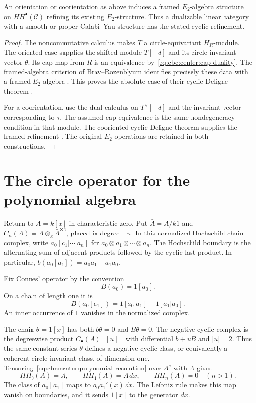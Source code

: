 \begin{theorem}\label{cbc:center:cyclic}
An orientation or coorientation as above induces a framed $E_2$-algebra structure on $HH^\bullet(\mathcal C)$ refining its existing $E_2$-structure.
Thus a dualizable linear category with a smooth or proper Calabi--Yau structure has the stated cyclic refinement.
\end{theorem}
\begin{proof}
The noncommutative calculus makes $T$ a circle-equivariant $H_R$-module.
The oriented case supplies the shifted module $T[-d]$ and its circle-invariant vector $\theta$.
Its cap map from $R$ is an equivalence by~\eqref{eq:cbc:center:cap-duality}.
The framed-algebra criterion of Brav--Rozenblyum identifies precisely these data with a framed $E_2$-algebra
\cite[Theorem~3.3.9]{BravRozenblyum}.
This proves the absolute case of their cyclic Deligne theorem
\cite[Theorem~4.1.7]{BravRozenblyum}.

For a coorientation, use the dual calculus on $T^\vee[-d]$ and the invariant vector corresponding to $\tau$.
The assumed cap equivalence is the same nondegeneracy condition in that module.
The cooriented cyclic Deligne theorem supplies the framed refinement
\cite[Theorem~4.3.4]{BravRozenblyum}.
The original $E_2$-operations are retained in both constructions.
\end{proof}

\section{The circle operator for the polynomial algebra}

Return to $A=k[x]$ in characteristic zero.
Put $\bar A=A/k1$ and $C_n(A)=A\otimes_k\bar A^{\otimes n}$, placed in degree $-n$.
In this normalized Hochschild chain complex, write
$a_0[a_1|\cdots|a_n]$ for $a_0\otimes\bar a_1\otimes\cdots\otimes\bar a_n$.
The Hochschild boundary is the alternating sum of adjacent products followed by the cyclic last product.
In particular, $b(a_0[a_1])=a_0a_1-a_1a_0$.

Fix Connes' operator by the convention
\[
 B(a_0)=1[a_0].
\]
On a chain of length one it is
\[
 B(a_0[a_1])=1[a_0|a_1]-1[a_1|a_0].
\]
An inner occurrence of $1$ vanishes in the normalized complex.

The chain $\theta=1[x]$ has both $b\theta=0$ and $B\theta=0$.
The negative cyclic complex is the degreewise product $C_\bullet(A)[[u]]$ with differential $b+uB$ and $|u|=2$.
Thus the same constant series $\theta$ defines a negative cyclic class, or equivalently a coherent circle-invariant class, of dimension one.
Tensoring~\eqref{eq:cbc:center:polynomial-resolution} over $A^e$ with $A$ gives
\[
 HH_0(A)=A,\qquad HH_1(A)=A\,dx,\qquad HH_n(A)=0\quad(n>1).
\]
The class of $a_0[a_1]$ maps to $a_0a_1'(x)\,dx$.
The Leibniz rule makes this map vanish on boundaries, and it sends $1[x]$ to the generator $dx$.

